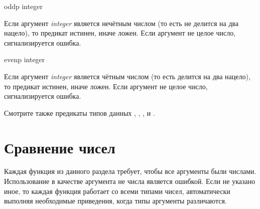 \begin{defun}[Функция]
oddp integer

Если аргумент \emph{integer} является нечётным числом (то есть не делится на два
нацело), то предикат истинен, иначе ложен.
Если аргумент не целое число, сигнализируется ошибка.
\end{defun}

\begin{defun}[Функция]
evenp integer

Если аргумент \emph{integer} является чётным числом (то есть делится на два
нацело), то предикат истинен, иначе ложен.
Если аргумент не целое число, сигнализируется ошибка.
\end{defun}

Смотрите также предикаты типов данных ,
, ,  и .

\section{Сравнение чисел}

Каждая функция из данного раздела требует, чтобы все аргументы были
числами. Использование в качестве аргумента не числа является ошибкой. Если не
указано иное, то каждая функция работает со всеми типами чисел, автоматически
выполняя необходимые приведения, когда типы аргументы различаются.

